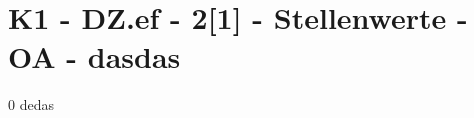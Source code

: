 \section{K1 - DZ.ef - 2[1] - Stellenwerte - OA - dasdas}

\begin{langesbeispiel}\item[0] %
dedas

\end{langesbeispiel}